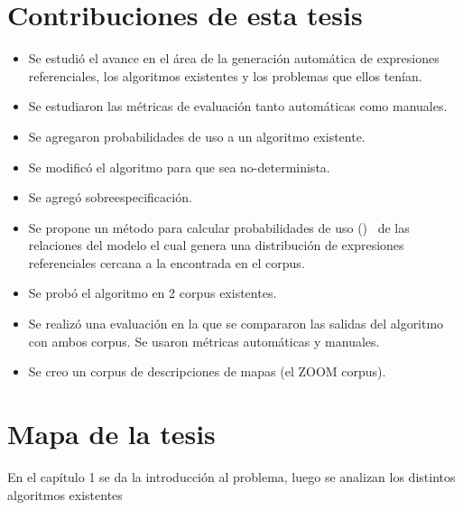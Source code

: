 \section{Contribuciones de esta tesis}
\label{sec:contribiciones}

\begin{itemize}
\item Se estudi\'o el avance en el \'area de la generaci\'on autom\'atica de expresiones referenciales, los algoritmos existentes y los problemas que ellos ten\'ian.
\item Se estudiaron las m\'etricas de evaluaci\'on tanto autom\'aticas como manuales.
\item Se agregaron probabilidades de uso a un algoritmo existente.
\item Se modific\'o el algoritmo para que sea no-determinista.
\item Se agreg\'o sobreespecificaci\'on.
\item Se propone un m\'etodo para calcular probabilidades de uso (\puse) \ de las relaciones del modelo el cual genera una distribuci\'on de expresiones referenciales cercana a la encontrada en el corpus.
\item Se prob\'o el algoritmo en 2 corpus existentes.
\item Se realiz\'o una evaluaci\'on en la que se compararon las salidas del algoritmo con ambos corpus. Se usaron m\'etricas autom\'aticas y manuales.
\item Se creo un corpus de descripciones de mapas (el ZOOM corpus).
\end{itemize}
\section{Mapa de la tesis}
\label{sec:mapadetesis}

En el cap\'itulo 1 se da la introducci\'on al problema, luego se analizan los distintos algoritmos existentes

